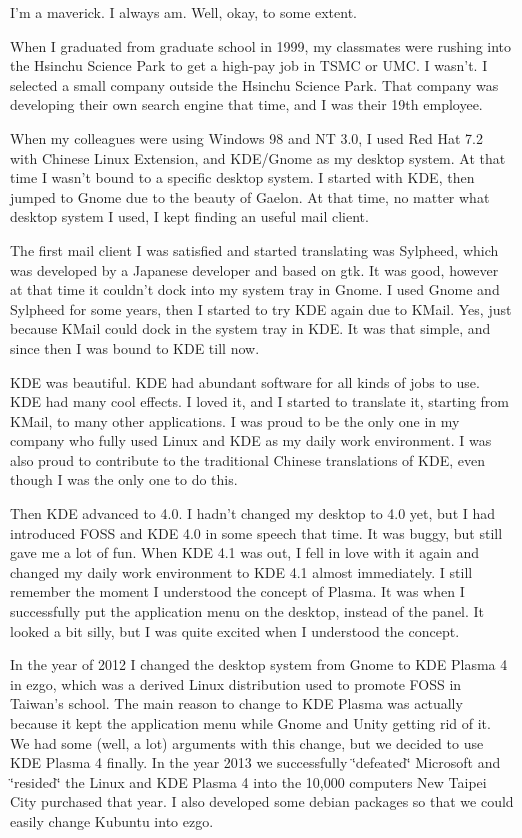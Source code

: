 


\noindent{}I'm a maverick. I always am. Well, okay, to some extent.

When I graduated from graduate school in 1999, my classmates were
rushing into the Hsinchu Science Park to get a high-pay job in TSMC
or UMC. I wasn't. I selected a small company outside the Hsinchu Science
Park. That company was developing their own search engine that time,
and I was their 19th employee.

When my colleagues were using Windows 98 and NT 3.0, I used Red Hat
7.2 with Chinese Linux Extension, and KDE/Gnome as my desktop system.
At that time I wasn't bound to a specific desktop system. I started
with KDE, then jumped to Gnome due to the beauty of Gaelon. At that
time, no matter what desktop system I used, I kept finding an useful
mail client.

The first mail client I was satisfied and started translating was
Sylpheed, which was developed by a Japanese developer and based on
gtk. It was good, however at that time it couldn't dock into my system
tray in Gnome. I used Gnome and Sylpheed for some years, then I started
to try KDE again due to KMail. Yes, just because KMail could dock
in the system tray in KDE. It was that simple, and since then I was
bound to KDE till now.

KDE was beautiful. KDE had abundant software for all kinds of jobs
to use. KDE had many cool effects. I loved it, and I started to translate
it, starting from KMail, to many other applications. I was proud to
be the only one in my company who fully used Linux and KDE as my daily
work environment. I was also proud to contribute to the traditional
Chinese translations of KDE, even though I was the only one to do
this.

Then KDE advanced to 4.0. I hadn't changed my desktop to 4.0 yet,
but I had introduced FOSS and KDE 4.0 in some speech that time. It
was buggy, but still gave me a lot of fun. When KDE 4.1 was out, I
fell in love with it again and changed my daily work environment to
KDE 4.1 almost immediately. I still remember the moment I understood
the concept of Plasma. It was when I successfully put the application
menu on the desktop, instead of the panel. It looked a bit silly,
but I was quite excited when I understood the concept.

In the year of 2012 I changed the desktop system from Gnome to KDE
Plasma 4 in ezgo, which was a derived Linux distribution used to promote
FOSS in Taiwan's school. The main reason to change to KDE Plasma was
actually because it kept the application menu while Gnome and Unity
getting rid of it. We had some (well, a lot) arguments with this change,
but we decided to use KDE Plasma 4 finally. In the year 2013 we successfully
\char`\"{}defeated\char`\"{} Microsoft and \char`\"{}resided\char`\"{}
the Linux and KDE Plasma 4 into the 10,000 computers New Taipei City
purchased that year. I also developed some debian packages so that
we could easily change Kubuntu into ezgo. 

